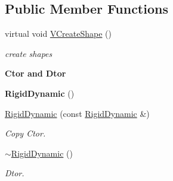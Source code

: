 \subsection*{Public Member Functions}
\begin{DoxyCompactItemize}
\item 
\hypertarget{classContent_1_1Actor_1_1Admin_1_1RigidDynamic_ada9ffdbde517a04a8cf05170445f7815}{
virtual void \hyperlink{classContent_1_1Actor_1_1Admin_1_1RigidDynamic_ada9ffdbde517a04a8cf05170445f7815}{VCreateShape} ()}
\label{classContent_1_1Actor_1_1Admin_1_1RigidDynamic_ada9ffdbde517a04a8cf05170445f7815}

\begin{DoxyCompactList}\small\item\em create shapes \item\end{DoxyCompactList}\end{DoxyCompactItemize}
\begin{Indent}{\bf Ctor and Dtor}\par
{\em \label{_amgrpad04e46909a047f9938f8e1fa1abe24a}
 }\begin{DoxyCompactItemize}
\item 
\hypertarget{classContent_1_1Actor_1_1Admin_1_1RigidDynamic_a7936e3f352a1e019e7b6e5c7d3bb921d}{
{\bfseries RigidDynamic} ()}
\label{classContent_1_1Actor_1_1Admin_1_1RigidDynamic_a7936e3f352a1e019e7b6e5c7d3bb921d}

\item 
\hypertarget{classContent_1_1Actor_1_1Admin_1_1RigidDynamic_ad16c092757b8c8783ef8f80102680d79}{
\hyperlink{classContent_1_1Actor_1_1Admin_1_1RigidDynamic_ad16c092757b8c8783ef8f80102680d79}{RigidDynamic} (const \hyperlink{classContent_1_1Actor_1_1Admin_1_1RigidDynamic}{RigidDynamic} \&)}
\label{classContent_1_1Actor_1_1Admin_1_1RigidDynamic_ad16c092757b8c8783ef8f80102680d79}

\begin{DoxyCompactList}\small\item\em Copy Ctor. \item\end{DoxyCompactList}\item 
\hypertarget{classContent_1_1Actor_1_1Admin_1_1RigidDynamic_a6bff8b33f7b6e7e327f4a2b877c0e433}{
\hyperlink{classContent_1_1Actor_1_1Admin_1_1RigidDynamic_a6bff8b33f7b6e7e327f4a2b877c0e433}{$\sim$RigidDynamic} ()}
\label{classContent_1_1Actor_1_1Admin_1_1RigidDynamic_a6bff8b33f7b6e7e327f4a2b877c0e433}

\begin{DoxyCompactList}\small\item\em Dtor. \item\end{DoxyCompactList}\end{DoxyCompactItemize}
\end{Indent}
